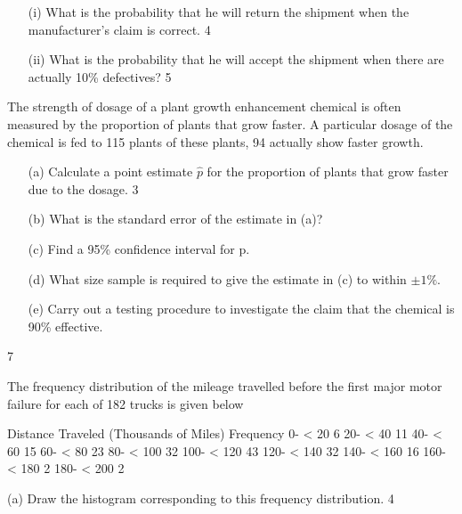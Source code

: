 \begin{itemize} 
\item[(i)] What is the probability that he will return the shipment when the  manufacturer's claim  is correct. 						4  

\item[(ii)] What is the probability that he will accept the shipment when there are actually 10\%  defectives? 							5 
\end{itemize}
The strength of dosage of a plant growth enhancement chemical 
is often measured by the proportion of plants that grow faster. 
A particular dosage of the chemical is fed to 115 plants of these plants, 94 actually show faster growth. 

\begin{itemize}       
\item[(a)] Calculate a point estimate $\hat{p}$ for the proportion of plants that grow faster due to the  dosage. 									3 
 
\item[(b)] What is the standard error of the estimate in (a)? 			
 
\item[(c)] Find a 95\% confidence interval for p. 					 
 
\item[(d)] What size sample is required to give the estimate in (c) to within $\pm 1\%$. 	 
 
\item[(e)] Carry out a testing procedure to investigate the claim that the chemical is 90\% effective.

\end{itemize}								7 
 
The frequency distribution of the mileage travelled before the first major motor failure 
for each of 182 trucks is given below 
 
 

 
Distance Traveled 
(Thousands of Miles) 		Frequency 
0- < 20 			      6 
20- < 40 			      11 
40- < 60 			      15 
60- < 80 			      23 
80- < 100 			      32 
100- < 120 		     43 
120- < 140 	                 32 
140- < 160 	                 16 
160- < 180 	                  2 
180- < 200 	                  2 
 
(a) Draw the histogram corresponding to this frequency distribution. 	4 

